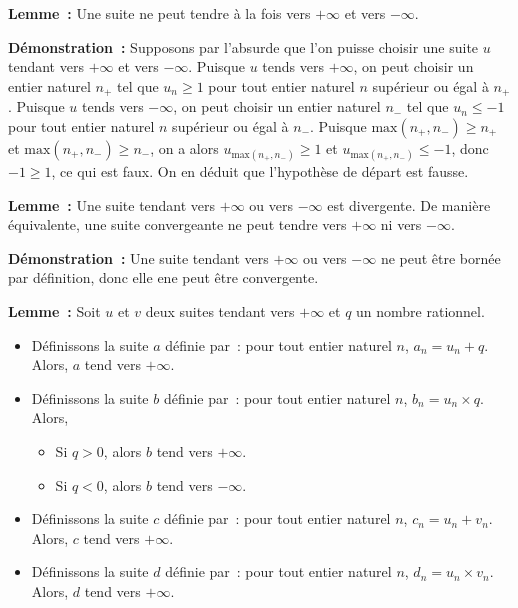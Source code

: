 \medskip

\noindent\textbf{Lemme :} Une suite ne peut tendre à la fois vers $+\infty$ et vers $-\infty$. 

\medskip

\noindent\textbf{Démonstration :} Supposons par l'absurde que l'on puisse choisir une suite $u$ tendant vers $+\infty$ et vers $-\infty$.
    Puisque $u$ tends vers $+\infty$, on peut choisir un entier naturel $n_+$ tel que $u_n \geq 1$ pour tout entier naturel $n$ supérieur ou égal à $n_+$.
    Puisque $u$ tends vers $-\infty$, on peut choisir un entier naturel $n_-$ tel que $u_n \leq -1$ pour tout entier naturel $n$ supérieur ou égal à $n_-$.
    Puisque $\mathrm{max}(n_+, n_-) \geq n_+$ et  $\mathrm{max}(n_+, n_-) \geq n_-$, on a alors $u_{ \mathrm{max}(n_+, n_-) } \geq 1$ et $u_{ \mathrm{max}(n_+, n_-) } \leq -1$, donc $-1 \geq 1$, ce qui est faux.
    On en déduit que l'hypothèse de départ est fausse.

    \done

\medskip

\noindent\textbf{Lemme :} Une suite tendant vers $+\infty$ ou vers $-\infty$ est divergente. 
    De manière équivalente, une suite convergeante ne peut tendre vers $+\infty$ ni vers $-\infty$.

\medskip

\noindent\textbf{Démonstration :} Une suite tendant vers $+\infty$ ou vers $-\infty$ ne peut être bornée par définition, donc elle ene peut être convergente.

\done

\medskip

\noindent\textbf{Lemme :} Soit $u$ et $v$ deux suites tendant vers $+\infty$ et $q$ un nombre rationnel.
    \begin{itemize}[nosep]
        \item Définissons la suite $a$ définie par : pour tout entier naturel $n$, $a_n = u_n + q$.
            Alors, $a$ tend vers $+\infty$.
        \item Définissons la suite $b$ définie par : pour tout entier naturel $n$, $b_n = u_n \times q$.
            Alors, 
            \begin{itemize}[nosep]
                \item Si $q > 0$, alors $b$ tend vers $+\infty$.
                \item Si $q < 0$, alors $b$ tend vers $-\infty$.
            \end{itemize}
        \item Définissons la suite $c$ définie par : pour tout entier naturel $n$, $c_n = u_n + v_n$.
            Alors, $c$ tend vers $+\infty$.
        \item Définissons la suite $d$ définie par : pour tout entier naturel $n$, $d_n = u_n \times v_n$.
            Alors, $d$ tend vers $+\infty$.
    \end{itemize}

